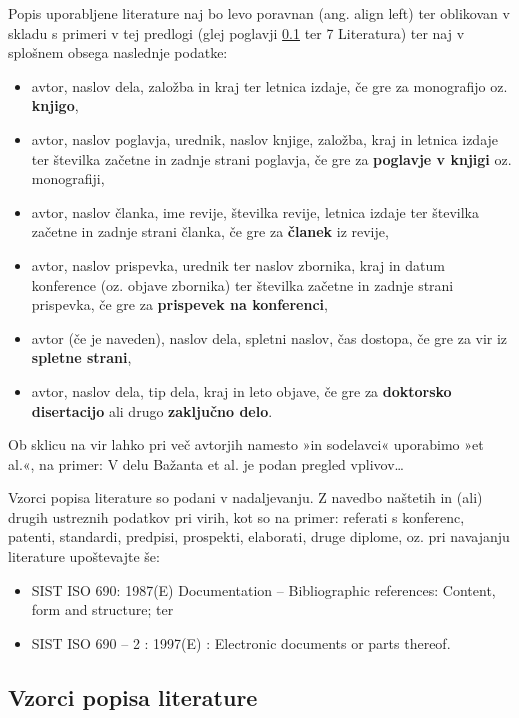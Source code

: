 Popis uporabljene literature naj bo levo poravnan (ang. align left) ter oblikovan v skladu s primeri v tej predlogi (glej poglavji \ref{sec:vzorci_lit}  ter 7 Literatura) ter naj v splošnem obsega naslednje podatke:
\begin{itemize}
\item avtor, naslov dela, založba in kraj ter letnica izdaje, če gre za monografijo oz. \textbf{knjigo},
\item avtor, naslov poglavja, urednik, naslov knjige, založba, kraj in letnica izdaje ter številka začetne in zadnje strani poglavja, če gre za \textbf{poglavje v knjigi} oz. monografiji,
\item avtor, naslov članka, ime revije, številka revije, letnica izdaje ter številka začetne in zadnje strani članka, če gre za \textbf{članek} iz revije,
\item avtor, naslov prispevka, urednik ter naslov zbornika, kraj in datum konference (oz. objave zbornika) ter številka začetne in zadnje strani prispevka, če gre za \textbf{prispevek na konferenci},
\item avtor (če je naveden), naslov dela, spletni naslov, čas dostopa, če gre za vir iz \textbf{spletne strani},
\item avtor, naslov dela, tip dela, kraj in leto objave, če gre za \textbf{doktorsko disertacijo} ali drugo \textbf{zaključno delo}.
\end{itemize}

Ob sklicu na vir lahko pri več avtorjih namesto »in sodelavci« uporabimo »et al.«, na primer: V delu Bažanta et al. \cite{bazant_1991} je podan pregled vplivov\ldots

Vzorci popisa literature so podani v nadaljevanju. Z navedbo naštetih in (ali) drugih ustreznih podatkov pri virih, kot so na primer: referati s konferenc, patenti, standardi, predpisi, prospekti, elaborati, druge diplome, oz. pri navajanju literature upoštevajte še:
\begin{itemize}
\item SIST ISO 690: 1987(E) Documentation – Bibliographic references: Content, form and structure; ter
\item SIST ISO 690 – 2 : 1997(E) : Electronic documents or parts thereof.
\end{itemize}


\subsection{Vzorci popisa literature}\label{sec:vzorci_lit}

